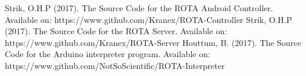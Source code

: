 
\begin{thebibliography}{3}
Strik, O.H.P (2017). The Source Code for the ROTA Android Controller. Available on: https://www.github.com/Kranex/ROTA-Controller
Strik, O.H.P (2017). The Source Code for the ROTA Server. Available on: https://www.github.com/Kranex/ROTA-Server
Houttum, B. (2017). The Source Code for the Arduino interpreter program. Available on: https://www.github.com/NotSoScientific/ROTA-Interpreter

\end{thebibliography}

